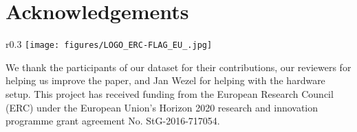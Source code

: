 \documentclass[runningheads]{llncs}
\begin{document}
\section*{Acknowledgements}
\begin{wrapfigure}{r}{0.3\columnwidth}
    \raggedleft
    \vspace{-4mm}
    \texttt{[image: figures/LOGO\_ERC-FLAG\_EU\_.jpg]}
\end{wrapfigure}
We thank the participants of our dataset for their contributions, our reviewers for helping us improve the paper, and Jan Wezel for helping with the hardware setup.
This project has received funding from the European Research Council (ERC) under the European Union’s Horizon 2020 research and innovation programme grant agreement No. StG-2016-717054.
 \clearpage


\end{document}
